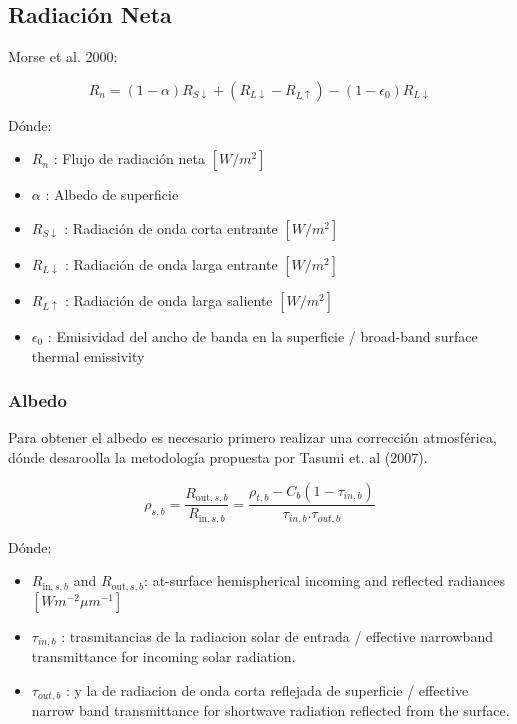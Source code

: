 \vspace{0.4cm}

\subsection{Radiación Neta}

Morse et al. 2000:

\begin{equation}
R_n = (1- \alpha)R_{S\downarrow} + (R_{L\downarrow} - R_{L\uparrow}) - (1- \epsilon_0)R_{L\downarrow}
\label{eq:1}
\end{equation}

Dónde: 
\begin{itemize}
    \item $R_n$ : Flujo de radiación neta $[W/m^2]$
    \item $\alpha$ : Albedo de superficie
    \item $R_{S\downarrow}$ : Radiación de onda corta entrante $[W/m^2]$
    \item $R_{L\downarrow}$ : Radiación de onda larga entrante $[W/m^2]$
    \item $R_{L\uparrow}$ : Radiación de onda larga saliente $[W/m^2]$
    \item $\epsilon_0$ : Emisividad del ancho de banda en la superficie / broad-band surface thermal emissivity
\end{itemize}

\vspace{0.4cm}

\subsubsection{Albedo}

Para obtener el albedo es necesario primero realizar una corrección atmosférica, dónde desaroolla la metodología propuesta por Tasumi et. al (2007).

\begin{equation}
\rho_{s,b} = \frac{R_{\text{out},s,b}}{R_{\text{in},s,b}} = \frac{\rho_{t,b} - C_b(1-\tau_{in,b})}{\tau_{in,b}.\tau_{out,b}}
\label{eq:1}
\end{equation}


Dónde:
\begin{itemize}
    \item $R_{\text{in},s,b}$ and $R_{\text{out},s,b}$: at-surface  hemispherical incoming and reflected radiances $[W m^{-2} \mu m^{-1}]$
    \item $\tau_{in,b}$ : trasmitancias de la radiacion solar de entrada / effective narrowband transmittance for incoming solar radiation.
    \item $\tau_{out,b}$ : y la de radiacion de onda corta reflejada de superficie / effective narrow band transmittance for shortwave radiation reflected from the surface.
\end{itemize}

